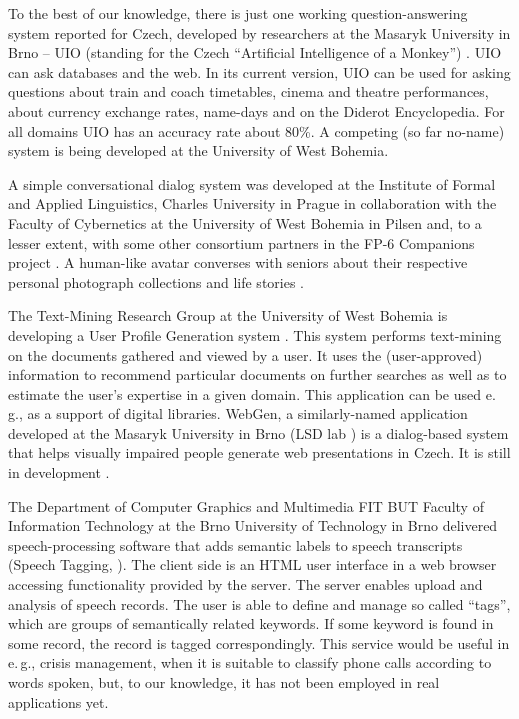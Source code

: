 \begin{multicols}{2}
To the best of our knowledge, there is just one working question-answering system reported for Czech, developed by researchers at the Masaryk University in Brno – UIO (standing for the Czech “Artificial Intelligence of a Monkey”) \cite{Svoboda2003}. UIO can ask databases and the web. In its current version, UIO can be used for asking questions about train and coach timetables, cinema and theatre performances, about currency exchange rates, name-days and on the Diderot Encyclopedia. For all domains UIO has an accuracy rate about 80\%. A competing (so far no-name) system is being developed at the University of West Bohemia.

A simple conversational dialog system was developed at the Institute of Formal and Applied Linguistics, Charles University in Prague in collaboration with the Faculty of Cybernetics at the University of West Bohemia in Pilsen and, to a lesser extent, with some other consortium partners in the FP-6 Companions project \cite{Note21}. A human-like avatar converses with seniors about their respective personal photograph collections and life stories \cite{Ptacek2010,Romportl2010,GruberTihelka2010}.

The Text-Mining Research Group at the University of West Bohemia is developing a User Profile Generation system \cite{Grolmus2003}. This system performs text-mining on the documents gathered and viewed by a user. It uses the (user-approved) information to recommend particular documents on further searches as well as to estimate the user’s expertise in a given domain. This application can be used e.\,g., as a support of digital libraries.
WebGen, a similarly-named application developed at the Masaryk University in Brno (LSD lab \cite{Note22}) is a dialog-based system that helps visually impaired people generate web presentations in Czech. It is still in development \cite{BartekPlhak2008}.

The Department of Computer Graphics and Multimedia FIT BUT Faculty of Information Technology at the Brno University of Technology in Brno delivered speech-processing software that adds semantic labels to speech transcripts (Speech Tagging, \cite{Smrz2010}). The client side is an HTML user interface in a web browser accessing functionality provided by the server. The server enables upload and analysis of speech records. The user is able to define and manage so called ``tags'', which are groups of semantically related keywords. If some keyword is found in some record, the record is tagged correspondingly. This service would be useful in e.\,g., crisis management, when it is suitable to classify phone calls according to words spoken, but, to our knowledge, it has not been employed in real applications yet.


\end{multicols}
